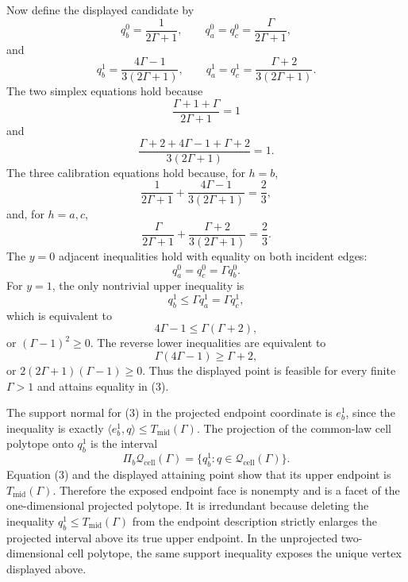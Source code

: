 \documentclass[11pt]{article}
\theoremstyle{definition}
\theoremstyle{plain}
\theoremstyle{remark}
\begin{document}
Now define the displayed candidate by
\[
  q_b^0=\frac{1}{2\Gamma+1},\qquad
  q_a^0=q_c^0=\frac{\Gamma}{2\Gamma+1},
\]
and
\[
  q_b^1=\frac{4\Gamma-1}{3(2\Gamma+1)},\qquad
  q_a^1=q_c^1=\frac{\Gamma+2}{3(2\Gamma+1)}.
\]
The two simplex equations hold because
\[
  \frac{\Gamma+1+\Gamma}{2\Gamma+1}=1
\]
and
\[
  \frac{\Gamma+2+4\Gamma-1+\Gamma+2}{3(2\Gamma+1)}=1.
\]
The three calibration equations hold because, for \(h=b\),
\[
  \frac{1}{2\Gamma+1}+\frac{4\Gamma-1}{3(2\Gamma+1)}=\frac23,
\]
and, for \(h=a,c\),
\[
  \frac{\Gamma}{2\Gamma+1}+\frac{\Gamma+2}{3(2\Gamma+1)}=\frac23.
\]
The \(y=0\) adjacent inequalities hold with equality on both incident edges:
\[
  q_a^0=q_c^0=\Gamma q_b^0.
\]
For \(y=1\), the only nontrivial upper inequality is
\[
  q_b^1\le \Gamma q_a^1=\Gamma q_c^1,
\]
which is equivalent to
\[
  4\Gamma-1\le \Gamma(\Gamma+2),
\]
or \((\Gamma-1)^2\ge 0\).  The reverse lower inequalities are equivalent to
\[
  \Gamma(4\Gamma-1)\ge \Gamma+2,
\]
or \(2(2\Gamma+1)(\Gamma-1)\ge 0\).  Thus the displayed point is feasible for every finite \(\Gamma>1\) and attains equality in (3).

The support normal for (3) in the projected endpoint coordinate is \(e_b^1\), since the inequality is exactly \(\langle e_b^1,q\rangle\le T_{\mathrm{mid}}(\Gamma)\).  The projection of the common-law cell polytope onto \(q_b^1\) is the interval
\[
  \Pi_b\mathcal Q_{\mathrm{cell}}(\Gamma)
  =
  \{q_b^1:q\in\mathcal Q_{\mathrm{cell}}(\Gamma)\}.
\]
Equation (3) and the displayed attaining point show that its upper endpoint is \(T_{\mathrm{mid}}(\Gamma)\).  Therefore the exposed endpoint face is nonempty and is a facet of the one-dimensional projected polytope.  It is irredundant because deleting the inequality \(q_b^1\le T_{\mathrm{mid}}(\Gamma)\) from the endpoint description strictly enlarges the projected interval above its true upper endpoint.  In the unprojected two-dimensional cell polytope, the same support inequality exposes the unique vertex displayed above.
\end{document}

